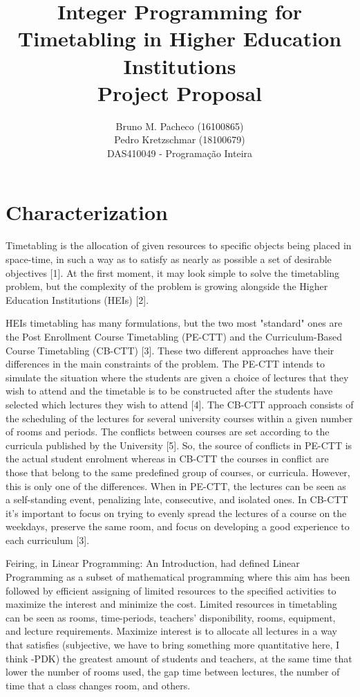\documentclass[a4paper]{report}
\begin{document}
 
\title{Integer Programming for Timetabling in Higher Education Institutions\\Project Proposal}
\author{Bruno M. Pacheco (16100865)\\
Pedro Kretzschmar (18100679) \\
DAS410049 - Programação Inteira}
 
\maketitle

\section*{Characterization}

Timetabling is the allocation of given resources to specific objects being placed in space-time, in such a way as to satisfy as nearly as possible a set of desirable objectives [1]. At the first moment, it may look simple to solve the timetabling problem, but the complexity of the problem is growing alongside the Higher Education Institutions (HEIs) [2].

HEIs timetabling has many formulations, but the two most "standard" ones are the Post Enrollment Course Timetabling (PE-CTT) and the Curriculum-Based Course Timetabling (CB-CTT) [3]. These two different approaches have their differences in the main constraints of the problem. The PE-CTT intends to simulate the situation where the students are given a choice of lectures that they wish to attend and the timetable is to be constructed after the students have selected which lectures they wish to attend [4]. The CB-CTT approach consists of the scheduling of the lectures for several university courses within a given number of rooms and periods. The conflicts between courses are set according to the curricula published by the University [5]. So, the source of conflicts in PE-CTT is the actual student enrolment whereas in CB-CTT the courses in conflict are those that belong to the same predefined group of courses, or curricula. However, this is only one of the differences. When in PE-CTT, the lectures can be seen as a self-standing event, penalizing late, consecutive, and isolated ones. In CB-CTT it's important to focus on trying to evenly spread the lectures of a course on the weekdays, preserve the same room, and focus on developing a good experience to each curriculum [3].

Feiring, in Linear Programming: An Introduction, had defined Linear Programming as a subset of mathematical programming where this aim has been followed by efficient assigning of limited resources to the specified activities to maximize the interest and minimize the cost. Limited resources in timetabling can be seen as rooms, time-periods, teachers' disponibility, rooms, equipment, and lecture requirements. Maximize interest is to allocate all lectures in a way that satisfies (subjective, we have to bring something more quantitative here, I think -PDK) the greatest amount of students and teachers, at the same time that lower the number of rooms used, the gap time between lectures, the number of time that a class changes room, and others.
\end{document}
